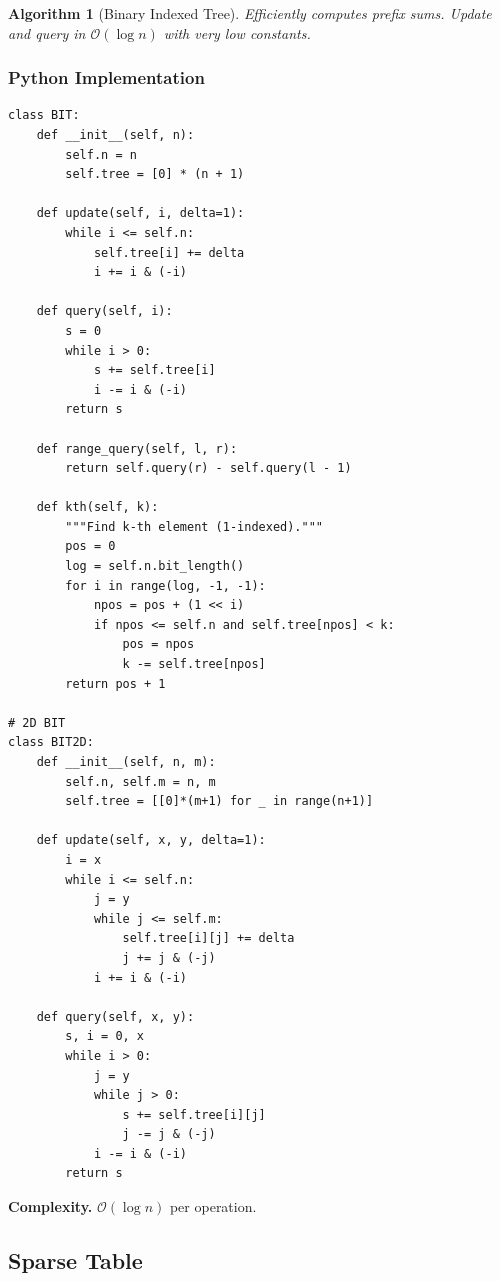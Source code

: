 \documentclass[10pt,a4paper]{article}
\theoremstyle{cpstyle}
\newtheorem{algorithm}[theorem]{Algorithm}
\newcommand{\bigO}[1]{\mathcal{O}\!\left(#1\right)}
\begin{document}
\begin{algorithm}[Binary Indexed Tree]
Efficiently computes prefix sums. Update and query in $\bigO{\log n}$ with very low constants.
\end{algorithm}

\subsubsection{Python Implementation}
\begin{lstlisting}[caption={Fenwick Tree -- prefix sum, range sum, 2D BIT}]
class BIT:
    def __init__(self, n):
        self.n = n
        self.tree = [0] * (n + 1)

    def update(self, i, delta=1):
        while i <= self.n:
            self.tree[i] += delta
            i += i & (-i)

    def query(self, i):
        s = 0
        while i > 0:
            s += self.tree[i]
            i -= i & (-i)
        return s

    def range_query(self, l, r):
        return self.query(r) - self.query(l - 1)

    def kth(self, k):
        """Find k-th element (1-indexed)."""
        pos = 0
        log = self.n.bit_length()
        for i in range(log, -1, -1):
            npos = pos + (1 << i)
            if npos <= self.n and self.tree[npos] < k:
                pos = npos
                k -= self.tree[npos]
        return pos + 1

# 2D BIT
class BIT2D:
    def __init__(self, n, m):
        self.n, self.m = n, m
        self.tree = [[0]*(m+1) for _ in range(n+1)]

    def update(self, x, y, delta=1):
        i = x
        while i <= self.n:
            j = y
            while j <= self.m:
                self.tree[i][j] += delta
                j += j & (-j)
            i += i & (-i)

    def query(self, x, y):
        s, i = 0, x
        while i > 0:
            j = y
            while j > 0:
                s += self.tree[i][j]
                j -= j & (-j)
            i -= i & (-i)
        return s
\end{lstlisting}

\textbf{Complexity.} $\bigO{\log n}$ per operation.

\subsection{Sparse Table}
\end{document}
